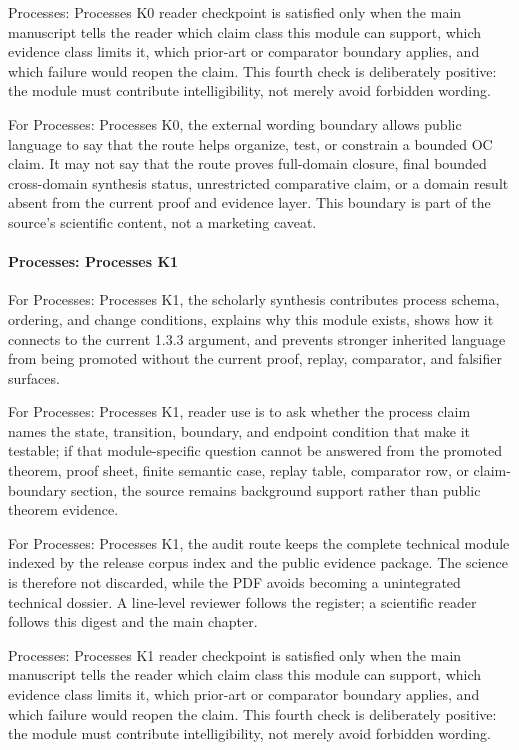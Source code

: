 Processes: Processes K0 reader checkpoint is satisfied only when the main manuscript tells the reader which claim class this module can support, which evidence class limits it, which prior-art or comparator boundary applies, and which failure would reopen the claim. This fourth check is deliberately positive: the module must contribute intelligibility, not merely avoid forbidden wording.


For Processes: Processes K0, the external wording boundary allows public language to say that the route helps organize, test, or constrain a bounded OC claim. It may not say that the route proves full-domain closure, final bounded cross-domain synthesis status, unrestricted comparative claim, or a domain result absent from the current proof and evidence layer. This boundary is part of the source's scientific content, not a marketing caveat.


\paragraph{Processes: Processes K1}

For Processes: Processes K1, the scholarly synthesis contributes process schema, ordering, and change conditions, explains why this module exists, shows how it connects to the current 1.3.3 argument, and prevents stronger inherited language from being promoted without the current proof, replay, comparator, and falsifier surfaces.


For Processes: Processes K1, reader use is to ask whether the process claim names the state, transition, boundary, and endpoint condition that make it testable; if that module-specific question cannot be answered from the promoted theorem, proof sheet, finite semantic case, replay table, comparator row, or claim-boundary section, the source remains background support rather than public theorem evidence.


For Processes: Processes K1, the audit route keeps the complete technical module indexed by the release corpus index and the public evidence package. The science is therefore not discarded, while the PDF avoids becoming a unintegrated technical dossier. A line-level reviewer follows the register; a scientific reader follows this digest and the main chapter.


Processes: Processes K1 reader checkpoint is satisfied only when the main manuscript tells the reader which claim class this module can support, which evidence class limits it, which prior-art or comparator boundary applies, and which failure would reopen the claim. This fourth check is deliberately positive: the module must contribute intelligibility, not merely avoid forbidden wording.


